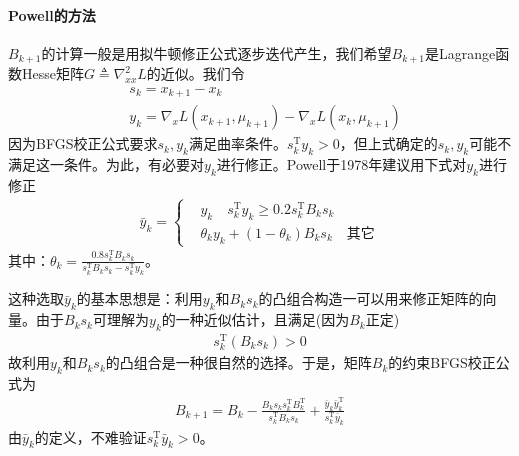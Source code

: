             \paragraph{Powell的方法}
            $B_{k+1}$的计算一般是用拟牛顿修正公式逐步迭代产生，我们希望$B_{k+1}$是Lagrange函数Hesse矩阵$G \triangleq {\nabla}^2_{xx}L$的近似。我们令
            \begin{align*}
             &s_k=x_{k+1}-x_k\\
             &y_k={\nabla}_xL(x_{k+1},{\mu}_{k+1})-{\nabla}_xL(x_{k},{\mu}_{k+1})
            \end{align*}
            因为BFGS校正公式要求$s_k,y_k$满足曲率条件。$s_k^\mathrm{T} y_k>0$，但上式确定的$s_k,y_k$可能不满足这一条件。为此，有必要对$y_k$进行修正。Powell于1978年建议用下式对$y_k$进行修正
            \begin{align*}
            {\bar{y}}_k = \left\{
            \begin{aligned}
            &y_k \quad s_k^\mathrm{T} y_k \geqslant 0.2s_k^\mathrm{T} B_ks_k\\
            &\theta_k y_k+(1-\theta_k)B_ks_k\quad \text{其它}
            \end{aligned}
            \right.
            \end{align*}
            其中：${\theta}_k=\frac{0.8s_k^\mathrm{T} B_ks_k}{s_k^\mathrm{T} B_ks_k-s_k^\mathrm{T} y_k}$。
            \par
            这种选取${\bar{y}}_k$的基本思想是：利用$y_k$和$B_ks_k$的凸组合构造一可以用来修正矩阵的向量。由于$B_ks_k$可理解为$y_k$的一种近似估计，且满足(因为$B_k$正定)
            \begin{align*}
             s_k^\mathrm{T} (B_ks_k)>0
            \end{align*}
            故利用$y_k$和$B_ks_k$的凸组合是一种很自然的选择。于是，矩阵$B_k$的约束BFGS校正公式为
            \begin{align*}
             B_{k+1}=B_k-\frac{B_ks_ks_k^\mathrm{T} B_k^\mathrm{T} }{s_k^\mathrm{T} B_ks_k}+\frac{{\bar{y}}_k{\bar{y}}_k^\mathrm{T} }{s_k^\mathrm{T} {\bar{y}}_k}
            \end{align*}
            由${\bar{y}}_k$的定义，不难验证$s_k^\mathrm{T} {\bar{y}}_k>0$。
